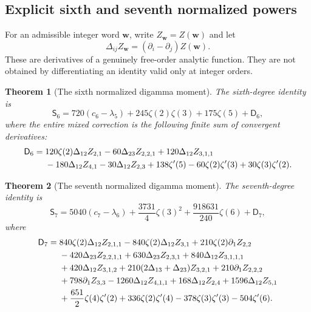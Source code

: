 \documentclass[11pt,a4paper]{article}
\numberwithin{equation}{section}
\newtheorem{theorem}{Theorem}[section]
\theoremstyle{definition}
\theoremstyle{remark}
\begin{document}
\subsection{Explicit sixth and seventh normalized powers}

For an admissible integer word $\mathbf w$, write
$Z_{\mathbf w}=Z(\mathbf w)$ and let
\begin{equation}\label{ac:directions}
 \Delta_{ij}Z_{\mathbf w}=(\partial_i-\partial_j)Z(\mathbf w).
\end{equation}
These are derivatives of a genuinely free-order analytic function.
They are not obtained by differentiating an identity valid only
at integer orders.

\begin{theorem}[The sixth normalized digamma moment]
\label{ac:sixth}
The sixth-degree identity is
\begin{equation}\label{ac:sixthmain}
 \boxed{\displaystyle
 \mathsf S_6=720(c_6-\lambda_5)
                +245\zeta(2)\zeta(3)+175\zeta(5)+\mathsf D_6,}
\end{equation}
where the entire mixed correction is the following finite sum of
convergent derivatives:
\begin{align}\label{ac:D6}
 \mathsf D_6={}&120\zeta(2)\Delta_{12}Z_{2,1}
      -60\Delta_{23}Z_{2,2,1}
      +120\Delta_{12}Z_{3,1,1}\notag\\
 &-180\Delta_{12}Z_{4,1}-30\Delta_{12}Z_{2,3}
      +138\zeta'(5)-60\zeta(2)\zeta'(3)
                        +30\zeta(3)\zeta'(2).
\end{align}
\end{theorem}

\begin{theorem}[The seventh normalized digamma moment]
\label{ac:seventh}
The seventh-degree identity is
\begin{equation}\label{ac:seventhmain}
 \boxed{\displaystyle
 \mathsf S_7=5040(c_7-\lambda_6)
       +\frac{3731}{4}\zeta(3)^2
       +\frac{918631}{240}\zeta(6)+\mathsf D_7,}
\end{equation}
where
\begin{align}\label{ac:D7}
 \mathsf D_7={}&840\zeta(2)\Delta_{12}Z_{2,1,1}
       -840\zeta(2)\Delta_{12}Z_{3,1}
       +210\zeta(2)\partial_1 Z_{2,2}\notag\\
 &-420\Delta_{23}Z_{2,2,1,1}
       +630\Delta_{23}Z_{2,3,1}
       +840\Delta_{12}Z_{3,1,1,1}\notag\\
 &+420\Delta_{12}Z_{3,1,2}
       +210(2\Delta_{13}+\Delta_{23})Z_{3,2,1}
       +210\partial_1 Z_{2,2,2}\notag\\
 &+798\partial_1 Z_{3,3}
       -1260\Delta_{12}Z_{4,1,1}
       +168\Delta_{12}Z_{2,4}+1596\Delta_{12}Z_{5,1}\notag\\
 &+\frac{651}{2}\zeta(4)\zeta'(2)
       +336\zeta(2)\zeta'(4)
       -378\zeta(3)\zeta'(3)-504\zeta'(6).
\end{align}
\end{theorem}
\end{document}
